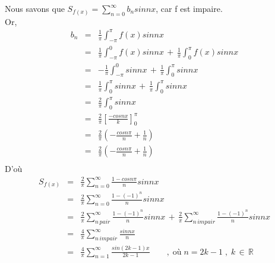 \documentclass[a4paper,12pt]{report}
\begin{document}
Nous savons que $S_{f(x)}=\displaystyle\sum\limits_{n=0}^{\infty} b_{n}sinnx$, car f est impaire.\\
Or, 
\begin{eqnarray*}
b_{n}&=&\frac{1}{\pi}\displaystyle\int_{-\pi}^{\pi}f(x)sinnx\\
		 &=&\frac{1}{\pi}\displaystyle\int_{-\pi}^{0}f(x)sinnx\,+\,\frac{1}{\pi}\displaystyle\int_{0}^{\pi}f(x)sinnx\\
		 &=&-\frac{1}{\pi}\displaystyle\int_{-\pi}^{0}sinnx\,+\,\frac{1}{\pi}\displaystyle\int_{0}^{\pi}sinnx\\
		 &=&\frac{1}{\pi}\displaystyle\int_{0}^{\pi}sinnx\,+\,\frac{1}{\pi}\displaystyle\int_{0}^{\pi}sinnx\\
		 &=&\frac{2}{\pi}\displaystyle\int_{0}^{\pi}sinnx\\
		&=&\frac{2}{\pi}\left[\frac{-cosnx}{k}\right]_0^\pi\\
		 &=&\frac{2}{\pi}\left(-\frac{cosn\pi}{n}+\frac{1}{n}\right)\\
		 &=&\frac{2}{\pi}\left(-\frac{cosn\pi}{n}+\frac{1}{n}\right)\\
	\end{eqnarray*}
D'o\`u 
\begin{eqnarray*}
S_{f(x)}&=&\frac{2}{\pi}\displaystyle\sum\limits_{n=0}^{\infty}\frac{1-cosn\pi}{n}sinnx\\
		&=&\frac{2}{\pi}\displaystyle\sum\limits_{n=0}^{\infty}\frac{1-(-1)^{n}}{n}sinnx\\
		&=&\frac{2}{\pi}\sum\limits_{n\,pair}^{\infty}\frac{1-(-1)^{n}}{n}sinnx\,+\,\frac{2}{\pi}\sum\limits_{n\,impair}^{\infty}\frac{1-(-1)^{n}}{n}sinnx\\
		&=&\frac{4}{\pi}\sum\limits_{n\,impair}^{\infty}\frac{sinnx}{n}\\
		&=&\frac{4}{\pi}\sum\limits_{n=1}^{\infty}\frac{sin(2k-1)x}{2k-1}\qquad,\;\text{o\`u}\;n=2k-1\;,\;k\,\in\,\pmb{\mathbb{R}}\\
	\end{eqnarray*}
\end{document}
